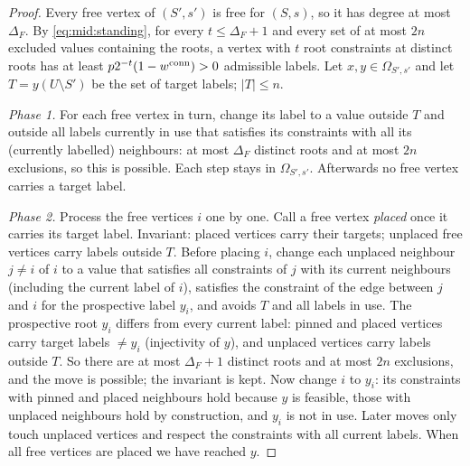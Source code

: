 \begin{proof}
Every free vertex of $(S',s')$ is free for $(S,s)$, so it has degree at most
$\Delta_F$. By \eqref{eq:mid:standing}, for every $t\le\Delta_F+1$ and every
set of at most $2n$ excluded values containing the roots, a vertex with $t$
root constraints at distinct roots has at least $p2^{-t}(1-w^{\rm conn})>0$
admissible labels. Let $x,y\in\Omega_{S',s'}$ and let $T=y(U\setminus S')$ be
the set of target labels; $|T|\le n$.

\emph{Phase 1.} For each free vertex in turn, change its label to a value
outside $T$ and outside all labels currently in use that satisfies its
constraints with all its (currently labelled) neighbours: at most $\Delta_F$
distinct roots and at most $2n$ exclusions, so this is possible. Each step stays
in $\Omega_{S',s'}$. Afterwards no free vertex carries a target label.

\emph{Phase 2.} Process the free vertices $i$ one by one. Call a free vertex
\emph{placed} once it carries its target label. Invariant: placed vertices carry
their targets; unplaced free vertices carry labels outside $T$. Before placing
$i$, change each unplaced neighbour $j\ne i$ of $i$ to a value that satisfies
all constraints of $j$ with its current neighbours (including the current label
of $i$), satisfies the constraint of the edge between $j$ and $i$ for the
prospective label $y_i$, and avoids $T$ and all labels in use. The prospective
root $y_i$ differs from every current label: pinned and placed vertices carry
target labels $\ne y_i$ (injectivity of $y$), and unplaced vertices carry labels
outside $T$. So there are at most $\Delta_F+1$ distinct roots and at most $2n$
exclusions, and the move is possible; the invariant is kept. Now change $i$ to
$y_i$: its constraints with pinned and placed neighbours hold because $y$ is
feasible, those with unplaced neighbours hold by construction, and $y_i$ is not
in use. Later moves only touch unplaced vertices and respect the constraints
with all current labels. When all free vertices are placed we have reached $y$.
\end{proof}

